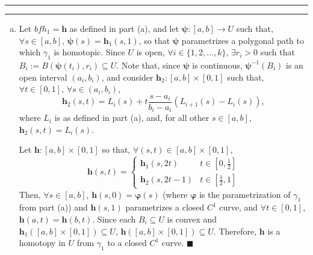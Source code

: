\documentclass[11pt]{article}
\newcounter{questionCounter}
\newcounter{partCounter}[questionCounter]
\newenvironment{question}[2][\arabic{questionCounter}]{%
    \setcounter{partCounter}{0}%
    \vspace{.25in} \hrule \vspace{0.5em}%
        \noindent{\bf #2}%
    \vspace{0.8em} \hrule \vspace{.10in}%
    \addtocounter{questionCounter}{1}%
}{}
\renewcommand{\qed}{\quad $\blacksquare$}
\newcommand{\bvarphi}{\boldsymbol{\varphi}}
\newcommand{\bpsi}{\boldsymbol{\psi}}
\newcommand{\bfh}{\mathbf{h}}
\begin{document}
\begin{question}{Problem 1}
\begin{enumerate}[(a)]
\item Let $bfh_1 = \bfh$ as defined in part (a), and let
$\bpsi: [a,b] \rightarrow U$ such that, $\forall s \in [a,b]$,
$\bpsi(s) = \bfh_1(s,1)$, so that $\bpsi$ parametrizes a polygonal path to
which $\gamma_1$ is homotopic. Since $U$ is open,
$\forall i \in \{1,2,\ldots,k\}$, $\exists r_i > 0$ such that
$B_i := B(\bpsi(t_i), r_i) \subseteq U$. Note that, since $\bpsi$ is
continuous, $\bpsi^{-1}(B_i)$ is an open interval $(a_i,b_i)$, and consider
$\bfh_2:[a,b] \times [0,1]$ such that,
$\forall t \in [0,1]$,
$\forall s \in (a_i,b_i)$,
\[\bfh_2(s,t)
 = L_i(s) + t\frac{s - a_i}{b_i - a_i}(L_{i + 1}(s) - L_i(s)),\]
where $L_i$ is as defined in part (a), and, for all other $s \in [a,b]$,
$\bfh_2(s,t) = L_i(s)$.

Let $\bfh:[a,b] \times [0,1]$ so that, $\forall (s,t) \in [a,b] \times [0,1]$,
\[\bfh(s,t)
  = \left\{
      \begin{array}{cc}
        \bfh_1(s,2t) & t \in [0,\frac12] \\
        \bfh_2(s,2t - 1) & t \in [\frac12,1]
      \end{array}
    \right.
\]
Then, $\forall s \in [a,b]$, $\bfh(s,0) = \bvarphi(s)$ (where $\bvarphi$ is
the parametrization of $\gamma_1$ from part (a)) and $\bfh(s,1)$ parametrizes
a closed $C^1$ curve, and $\forall t \in [0,1]$, $\bfh(a,t) = \bfh(b,t)$.
Since each $B_i \subseteq U$ is convex and
$\bfh_1([a,b] \times [0,1]) \subseteq U$,
$\bfh([a,b] \times [0,1]) \subseteq U$.
Therefore, $\bfh$ is a homotopy in $U$ from $\gamma_1$ to a closed $C^1$
curve. \qed
\end{enumerate}
\end{question}
\end{document}
